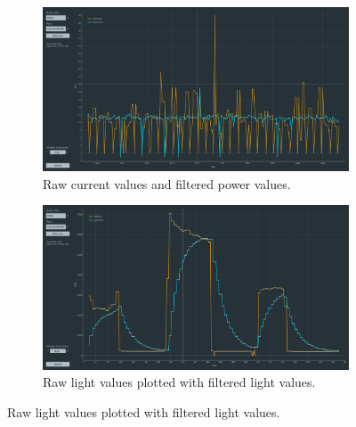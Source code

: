 \documentclass[a4paper, 11pt, titlepage]{article}
\begin{document}
\begin{figure}[H]
    \centering

    \begin{subfigure}{0.45\textwidth}
        \centering
        \includegraphics[width=\linewidth]{images/power_serial_plot.png}
        \caption{Raw current values and filtered power values.}
        \label{fig:power_serial}
    \end{subfigure}
    \hfill
    \begin{subfigure}{0.45\textwidth}
        \centering
        \includegraphics[width=\linewidth]{images/light_serial_plot.png}
        \caption{Raw light values plotted with filtered light values.}
        \label{fig:light_serial}
    \end{subfigure}
    
    \vspace{4mm}


\end{figure}
\end{document}
